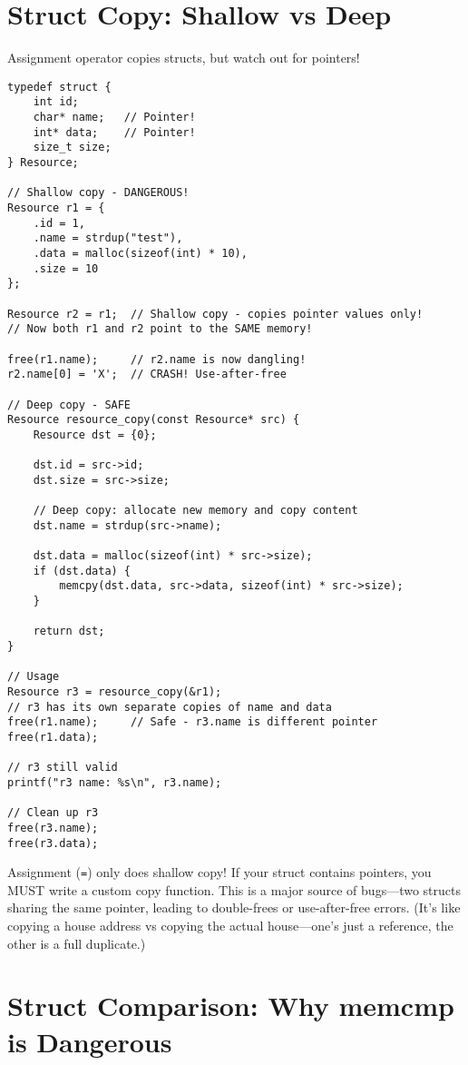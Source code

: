 \section{Struct Copy: Shallow vs Deep}

Assignment operator copies structs, but watch out for pointers!

\begin{lstlisting}
typedef struct {
    int id;
    char* name;   // Pointer!
    int* data;    // Pointer!
    size_t size;
} Resource;

// Shallow copy - DANGEROUS!
Resource r1 = {
    .id = 1,
    .name = strdup("test"),
    .data = malloc(sizeof(int) * 10),
    .size = 10
};

Resource r2 = r1;  // Shallow copy - copies pointer values only!
// Now both r1 and r2 point to the SAME memory!

free(r1.name);     // r2.name is now dangling!
r2.name[0] = 'X';  // CRASH! Use-after-free

// Deep copy - SAFE
Resource resource_copy(const Resource* src) {
    Resource dst = {0};

    dst.id = src->id;
    dst.size = src->size;

    // Deep copy: allocate new memory and copy content
    dst.name = strdup(src->name);

    dst.data = malloc(sizeof(int) * src->size);
    if (dst.data) {
        memcpy(dst.data, src->data, sizeof(int) * src->size);
    }

    return dst;
}

// Usage
Resource r3 = resource_copy(&r1);
// r3 has its own separate copies of name and data
free(r1.name);     // Safe - r3.name is different pointer
free(r1.data);

// r3 still valid
printf("r3 name: %s\n", r3.name);

// Clean up r3
free(r3.name);
free(r3.data);
\end{lstlisting}

\begin{warningbox}
Assignment (\texttt{=}) only does shallow copy! If your struct contains pointers, you MUST write a custom copy function. This is a major source of bugs—two structs sharing the same pointer, leading to double-frees or use-after-free errors. (It's like copying a house address vs copying the actual house—one's just a reference, the other is a full duplicate.)
\end{warningbox}

\section{Struct Comparison: Why memcmp is Dangerous}

